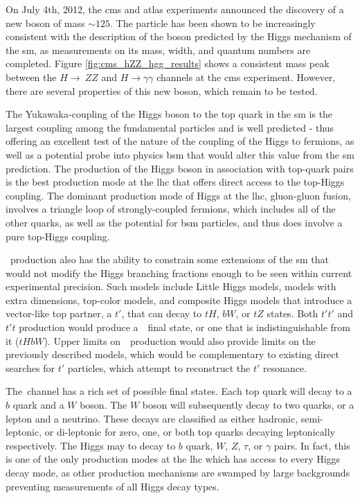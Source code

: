 \par On July 4th, 2012, the \acrfull{cms} and \acrfull{atlas} experiments announced the discovery of a new boson of mass $\sim125$\GeV \cite{CMS:2012discovery}\cite{ATLAS:2012discovery}.  The particle has been shown to be increasingly consistent with the description of the boson predicted by the Higgs mechanism of the \acrshort{sm}, as measurements on its mass, width, and quantum numbers are completed.  Figure \ref{fig:cms_hZZ_hgg_results} shows a consistent mass peak between the $H\rightarrow~ZZ$ and $H\rightarrow\gamma\gamma$ channels at the \acrshort{cms} experiment.  However, there are several properties of this new boson, which remain to be tested. 

\par The Yukawaka-coupling of the Higgs boson to the top quark in the \acrshort{sm} is the largest coupling among the fundamental particles and is well 
predicted - thus offering an excellent test of the nature of the coupling of the Higgs to fermions, as well as a potential probe into physics \acrfull{bsm} that would alter this value from the \acrshort{sm} prediction.  The production of the Higgs boson in association with top-quark pairs is the best production mode at the \acrshort{lhc} that offers direct access to the top-Higgs coupling.  The dominant production mode of Higgs at the \acrshort{lhc}, gluon-gluon fusion, involves a triangle loop of strongly-coupled fermions, which includes all of the other quarks, as well as the potential for \acrshort{bsm} particles, and thus does involve a pure top-Higgs coupling.  

\par ~\ttH production also has the ability to constrain some extensions of the \acrshort{sm} that would not modify the Higgs branching fractions enough to be seen 
within current experimental precision.  Such models include Little Higgs models, models with extra dimensions, top-color models, and composite Higgs models that introduce a vector-like top partner, a $t'$, that can decay to $tH$, $bW$, or $tZ$ states.  Both $t't'$ and $t't$ production would produce a~\ttH~final state, or one that is indistinguishable from it ($tHbW$).  Upper limits on~\ttH~production would also provide limits on the previously described models, which would be complementary to existing direct searches for $t'$ particles, which attempt to reconstruct the $t'$ resonance.  

\par The~\ttH channel has a rich set of possible final states.  Each top quark will decay to a $b$ quark and a $W$ boson.  The $W$ boson will subsequently decay to two quarks, or a lepton and a neutrino.  These decays are classified as either hadronic, semi-leptonic, or di-leptonic for zero, one, or both top quarks decaying leptonically 
respectively.  The Higgs may to decay to $b$ quark, $W$, $Z$, $\tau$, or $\gamma$ pairs.  In fact, this is one of the only production modes at the \acrshort{lhc} which 
has access to every Higgs decay mode, as other production mechanisms are swamped by large backgrounds preventing measurements of all Higgs decay types.  

